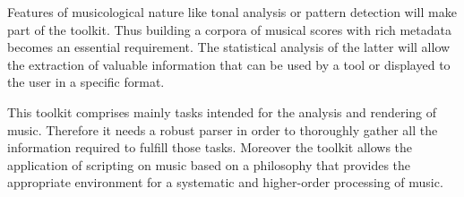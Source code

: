 \documentclass[main.tex]{subfiles}
\begin{document}
Features of musicological nature like tonal analysis or pattern detection will make part of
the toolkit. Thus building a corpora of musical scores with rich metadata becomes an
essential requirement. The statistical analysis of the latter will allow the extraction of valuable
information that can be used by a tool or displayed to the user in a specific format.

This toolkit comprises mainly tasks intended for the analysis and rendering of music.
Therefore it needs a robust parser in order to thoroughly gather all the information required to
fulfill those tasks. Moreover the toolkit allows the application of scripting on music based on
a philosophy that provides the appropriate environment for a systematic and higher-order processing
of music.

\newpage 

\end{document}

